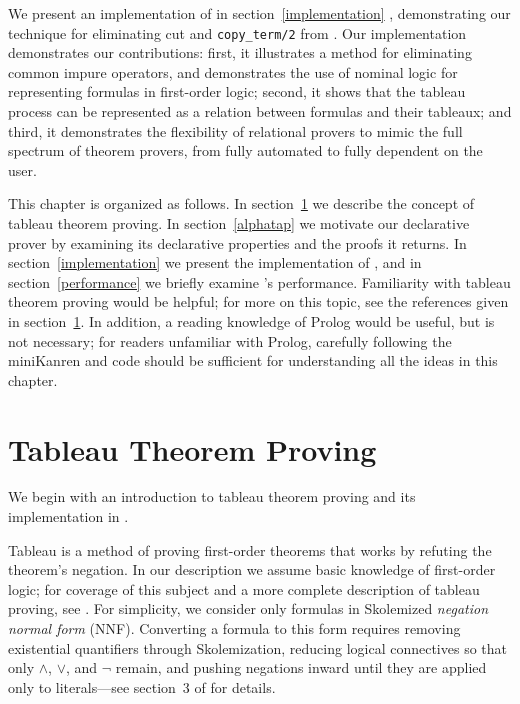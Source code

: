We present an implementation of \alphatapsp in
section~\ref{implementation} , demonstrating our technique for
eliminating cut and \mbox{\texttt{copy\_term/2}} from \leantap. Our
implementation demonstrates our contributions: first, it illustrates a
method for eliminating common impure operators, and demonstrates the
use of nominal logic for representing formulas in first-order logic;
second, it shows that the tableau process can be represented as a
relation between formulas and their tableaux; and third, it
demonstrates the flexibility of relational provers to mimic the full
spectrum of theorem provers, from fully automated to fully dependent
on the user.

This chapter is organized as follows. In section~\ref{tableau} we
describe the concept of tableau theorem proving. In
section~\ref{alphatap} we motivate our declarative prover by examining
its declarative properties and the proofs it returns. In
section~\ref{implementation} we present the implementation of
\alphatap, and in section~\ref{performance} we briefly examine
\alphatap's performance. Familiarity with tableau theorem proving
would be helpful; for more on this topic, see the references given in
section~\ref{tableau}.  In addition, a reading knowledge of Prolog
would be useful, but is not necessary; for readers unfamiliar with
Prolog, carefully following the miniKanren and \alphakanrensp code
should be sufficient for understanding all the ideas in this chapter.

\section{Tableau Theorem Proving}\label{tableau}

We begin with an introduction to tableau theorem proving and its
implementation in \leantap.


Tableau is a method of proving first-order theorems that works by
refuting the theorem's negation. In our description we assume basic
knowledge of first-order logic; for coverage of this subject and a
more complete description of tableau proving, see
\citet{fitting1996fol}.  For simplicity, we consider only
formulas in Skolemized \textit{negation normal form} (NNF).
Converting a formula to this form requires removing existential
quantifiers through Skolemization, reducing logical connectives so
that only $\wedge$, $\vee$, and $\neg$ remain, and pushing negations
inward until they are applied only to literals---see section~3 of
\citet{beckert95leantap} for details.

